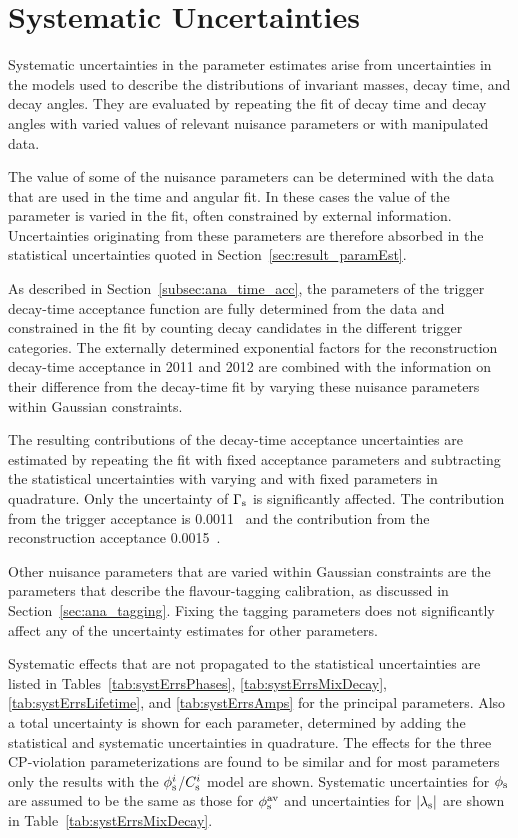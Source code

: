 \section{Systematic Uncertainties}
\label{sec:result_syst}

Systematic uncertainties in the parameter estimates arise from uncertainties in the models used to describe the distributions of invariant
masses, decay time, and decay angles. They are evaluated by repeating the fit of decay time and decay angles with varied values of relevant
nuisance parameters or with manipulated data.

The value of some of the nuisance parameters can be determined with the \BstoJpsiKK{} data that are used in the time and angular fit. In
these cases the value of the parameter is varied in the fit, often constrained by external information. Uncertainties originating from
these parameters are therefore absorbed in the statistical uncertainties quoted in Section~\ref{sec:result_paramEst}.

As described in Section~\ref{subsec:ana_time_acc}, the parameters of the trigger decay-time acceptance function are fully determined from
the \BstoJpsiKK{} data and constrained in the fit by counting decay candidates in the different trigger categories. The externally
determined exponential factors for the reconstruction decay-time acceptance in 2011 and 2012 are combined with the information on their
difference from the decay-time fit by varying these nuisance parameters within Gaussian constraints.

The resulting contributions of the decay-time acceptance uncertainties are estimated by repeating the fit with fixed acceptance parameters
and subtracting the statistical uncertainties with varying and with fixed parameters in quadrature. Only the uncertainty of $\Gamma_\text{s}$ is
significantly affected. The contribution from the trigger acceptance is 0.0011~\invps{} and the contribution from the reconstruction
acceptance 0.0015~\invps.

Other nuisance parameters that are varied within Gaussian constraints are the parameters that describe the flavour-tagging calibration, as
discussed in Section~\ref{sec:ana_tagging}. Fixing the tagging parameters does not significantly affect any of the uncertainty estimates
for other parameters.

Systematic effects that are not propagated to the statistical uncertainties are listed in Tables~\ref{tab:systErrsPhases},
\ref{tab:systErrsMixDecay}, \ref{tab:systErrsLifetime}, and \ref{tab:systErrsAmps} for the principal parameters. Also a total uncertainty
is shown for each parameter, determined by adding the statistical and systematic uncertainties in quadrature. The effects for the three
CP-violation parameterizations are found to be similar and for most parameters only the results with the $\phi_\text{s}^{i}$/$C_\text{s}^{i}$ model are shown.
Systematic uncertainties for $\phi_\text{s}$ are assumed to be the same as those for $\phi_\text{s}^{\text{av}}$ and uncertainties for $|{\lambda_{\text{s}}}|$ are shown in
Table~\ref{tab:systErrsMixDecay}.


